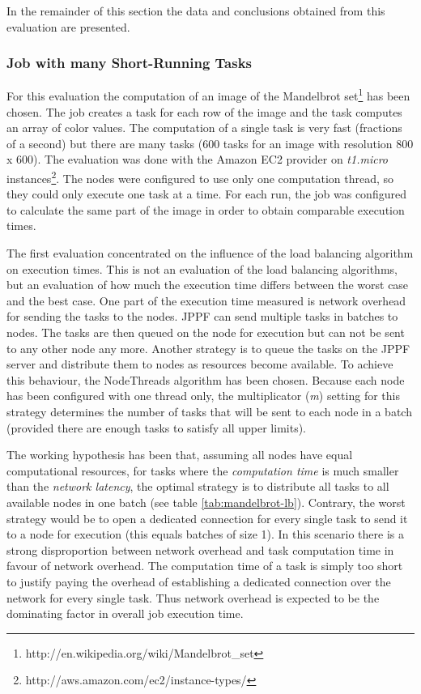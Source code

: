 \documentclass[english]{uzhpub}
\begin{document}
In the remainder of this section the data and conclusions obtained from this evaluation are presented.

\subsubsection{Job with many Short-Running Tasks}
\label{short-tasks}

For this evaluation the computation of an image of the Mandelbrot set\footnote{http://en.wikipedia.org/wiki/Mandelbrot\_set} has been chosen. The job creates a task for each row of the image and the task computes an array of color values. The computation of a single task is very fast (fractions of a second) but there are many tasks (600 tasks for an image with resolution 800 x 600). The evaluation was done with the Amazon EC2 provider on \textit{t1.micro} instances\footnote{http://aws.amazon.com/ec2/instance-types/}. The nodes were configured to use only one computation thread, so they could only execute one task at a time. For each run, the job was configured to calculate the same part of the image in order to obtain comparable execution times. 

The first evaluation concentrated on the influence of the load balancing algorithm on execution times. This is not an evaluation of the load balancing algorithms, but an evaluation of how much the execution time differs between the worst case and the best case. One part of the execution time measured is network overhead for sending the tasks to the nodes. JPPF can send multiple tasks in batches to nodes. The tasks are then queued on the node for execution but can not be sent to any other node any more. Another strategy is to queue the tasks on the JPPF server and distribute them to nodes as resources become available. To achieve this behaviour, the NodeThreads algorithm has been chosen. Because each node has been configured with one thread only, the multiplicator (\textit{m}) setting for this strategy determines the number of tasks that will be sent to each node in a batch (provided there are enough tasks to satisfy all upper limits).

The working hypothesis has been that, assuming all nodes have equal computational resources, for tasks where the \textit{computation time} is much smaller than the \textit{network latency}, the optimal strategy is to distribute all tasks to all available nodes in one batch (see table \ref{tab:mandelbrot-lb}). Contrary, the worst strategy would be to open a dedicated connection for every single task to send it to a node for execution (this equals batches of size 1). In this scenario there is a strong disproportion between network overhead and task computation time in favour of network overhead. The computation time of a task is simply too short to justify paying the overhead of establishing a dedicated connection over the network for every single task. Thus network overhead is expected to be the dominating factor in overall job execution time.
\end{document}

